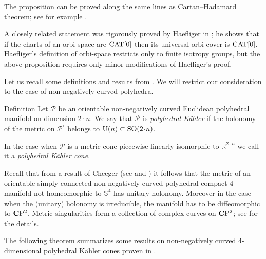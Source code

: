 \documentclass{compositio}
\begin{document}
The proposition can be proved along the same lines as Cartan--Hadamard theorem;
see for example \cite{akp}.

A closely related statement was rigorously proved by Haefliger in \cite{haefliger};
he shows that if the charts of an orbi-space are $\mathrm{CAT}[0]$
then its universal orbi-cover is $\mathrm{CAT}[0]$.
Haefliger's definition of orbi-space restricts only to finite isotropy groups, but the above proposition requires only minor modifications of  Haefliger's  proof.

Let us recall  some definitions and results
from \cite{panov}.
We will restrict our consideration to the case of non-negatively curved polyhedra.

\begin{thm}{Definition}\label{PKdefinition} Let $\mathcal{P}$ be an orientable non-negatively curved Euclidean
polyhedral manifold on dimension $2{\cdot}n$.
We say that  $\mathcal{P}$ is
\emph{polyhedral K\"ahler} if the holonomy of the metric
on $\mathcal{P}^\circ$ belongs to
$\mathrm{U}(n)\subset \SO(2\cdot n)$.

In the case  when $\mathcal{P}$ is a metric cone
piecewise linearly isomorphic to $\mathbb R^{2\cdot n}$ we call it a \emph{polyhedral K\"ahler cone}.
\end{thm}

Recall that from a result of Cheeger (see \cite{cheeger} and \cite[Proposition 2.3]{panov})
it follows that the metric of an orientable simply connected non-negatively curved polyhedral
compact $4$-manifold not homeomorphic to $\mathbb{S}^4$ has unitary holonomy.
Moreover in the case when the (unitary) holonomy is irreducible,
the manifold has to be diffeomorphic to $\mathbf{C}\mathrm{P}^2$. Metric singularities
form a collection of complex curves on $\mathbf{C}\mathrm{P}^2$;
see \cite{panov} for the details.

The following theorem summarizes some results on non-negatively
curved $4$-dimensional polyhedral K\"ahler cones proven in \cite[Theorems 1.5, 1.7, 1.8]{panov}.
\end{document}
